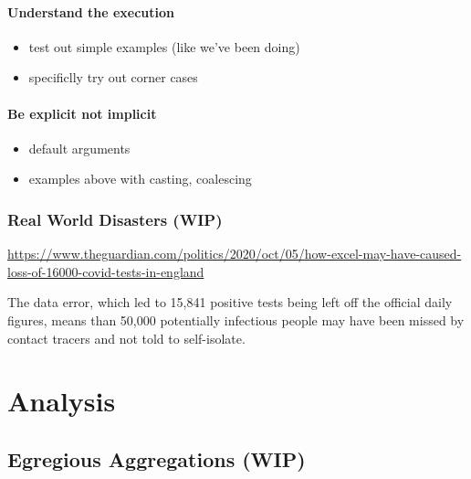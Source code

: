 \documentclass[
]{krantz}
\providecommand{\tightlist}{%
  \setlength{\itemsep}{0pt}\setlength{\parskip}{0pt}}
\renewenvironment{quote}{\begin{VF}}{\end{VF}}
\begin{document}
\hypertarget{understand-the-execution-1}{%
\subsection{Understand the execution}\label{understand-the-execution-1}}

\begin{itemize}
\tightlist
\item
  test out simple examples (like we've been doing)
\item
  specificlly try out corner cases
\end{itemize}

\hypertarget{be-explicit-not-implicit}{%
\subsection{Be explicit not implicit}\label{be-explicit-not-implicit}}

\begin{itemize}
\tightlist
\item
  default arguments
\item
  examples above with casting, coalescing
\end{itemize}

\hypertarget{real-world-disasters-wip}{%
\section{Real World Disasters (WIP)}\label{real-world-disasters-wip}}

\url{https://www.theguardian.com/politics/2020/oct/05/how-excel-may-have-caused-loss-of-16000-covid-tests-in-england}

\begin{quote}
The data error, which led to 15,841 positive tests being left off the official daily figures, means than 50,000 potentially infectious people may have been missed by contact tracers and not told to self-isolate.
\end{quote}

\hypertarget{part-analysis}{%
\part*{Analysis}\label{part-analysis}}


\hypertarget{eg-agg}{%
\chapter{Egregious Aggregations (WIP)}\label{eg-agg}}
\end{document}
